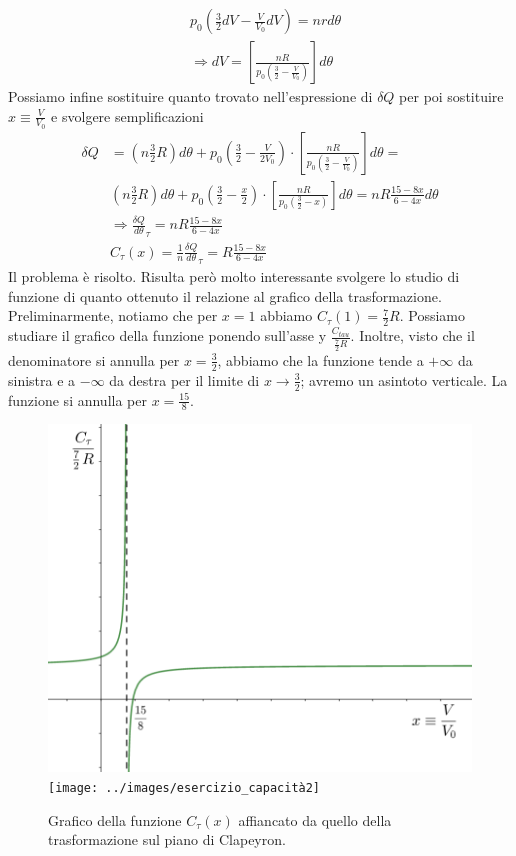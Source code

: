 \documentclass[
10pt, %
a4paper, %
oneside, %
headinclude,footinclude, %
BCOR5mm, %
]{scrartcl}
\begin{document}
\begin{exercise}
	\begin{align*}
		&p_0\left(\frac{3}{2}dV - \frac{V}{V_0}dV\right) = n r d\theta\\
		&\Rightarrow dV = \left[\frac{n R}{p_0 \left(\frac{3}{2}-\frac{V}{V_0}\right)}\right]d\theta
	\end{align*}
	Possiamo infine sostituire quanto trovato nell'espressione di $\delta Q$ per poi sostituire \(x \equiv \frac{V}{V_0}\) e svolgere semplificazioni
	\begin{align*}
		\delta Q &= \left(n \frac{3}{2} R\right) d\theta + p_0 \left(\frac{3}{2} - \frac{V}{2 V_0}\right) \cdot \left[\frac{n R}{p_0 \left(\frac{3}{2}-\frac{V}{V_0}\right)}\right]d\theta =\\
		&\left(n \frac{3}{2} R\right) d\theta + p_0 \left(\frac{3}{2} - \frac{x}{2}\right) \cdot \left[\frac{n R}{p_0 \left(\frac{3}{2}- x \right)}\right]d\theta= n R \frac{15-8x}{6-4x}d\theta\\
		&\Rightarrow \frac{\delta Q}{d\theta}_{\tau} = n R \frac{15-8x}{6-4x}\\
		&C_{\tau}(x) = \frac{1}{n}\frac{\delta Q}{d\theta}_{\tau} = R \frac{15-8x}{6-4x}
	\end{align*}
	Il problema è risolto. Risulta però molto interessante svolgere lo studio di funzione di quanto ottenuto il relazione al grafico della trasformazione. \\
	Preliminarmente, notiamo che per \(x = 1\) abbiamo \(C_{\tau}(1) = \frac{7}{2}R\). Possiamo studiare il grafico della funzione ponendo sull'asse y \(\frac{C_{tau}}{\frac{7}{2}R}\). Inoltre, visto che il denominatore si annulla per \(x = \frac{3}{2}\), abbiamo che la funzione tende a \(+\infty \) da sinistra e a  \(-\infty\) da destra per il limite di $x \to \frac{3}{2}$; avremo un asintoto verticale. La funzione si annulla per $x = \frac{15}{8}$.
	
	\begin{figure}[h!]
		\centering
		\includegraphics[width=0.45\linewidth]{../images/studio_di_funz}\quad
		\texttt{[image: ../images/esercizio\_capacità2]}
		\caption{Grafico della funzione $C_{\tau}(x)$ affiancato da quello della trasformazione sul piano di Clapeyron.}
		\label{fig:studiodifunz}
	\end{figure}
	\FloatBarrier
	

\end{exercise}
\end{document}
